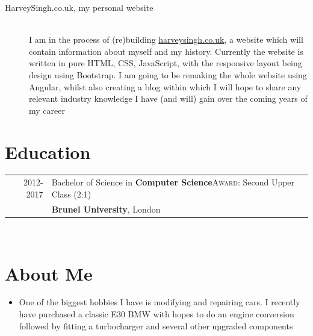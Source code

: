 \documentclass[a4paper,10pt]{extarticle} %
\begin{document}
{\begin{description}
\item[HarveySingh.co.uk, my personal website]\hfill \\
I am in the process of (re)building \href{harveysingh.co.uk}{harveysingh.co.uk}, a website which will contain information about myself and my history. Currently the website is written in pure HTML, CSS, JavaScript, with the responsive layout being design using Bootstrap. I am going to be remaking the whole website using Angular, whilst also creating a blog within which I will hope to share any relevant industry knowledge I have (and will) gain over the coming years of my career

\end{description}


\section{\textcolor{primary}{Education}}
\begin{tabular}{r|p{17.5cm}}	
2012-2017 & Bachelor of Science in \textbf{Computer Science}\hfill\textsc{Award}: Second Upper Class (2:1)\\
&\textbf{Brunel University}, London\\
\end{tabular}
\\


\section{\textcolor{primary}{About Me}}

\begin{itemize}
\vspace{0.2cm}

\item One of the biggest hobbies I have is modifying and repairing cars. I recently have purchased a classic E30 BMW with hopes to do an engine conversion followed by fitting a turbocharger and several other upgraded components


\end{itemize}}
\end{document}
